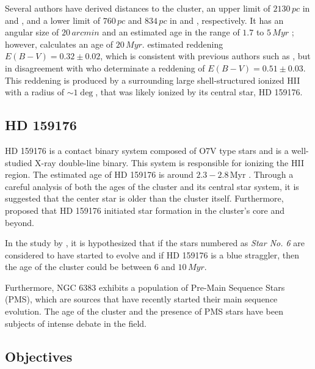 \documentclass[baaa]{baaa}
\begin{document}
Several authors have derived distances to the cluster, an upper limit of $2130\,pc$ in \citet{1930LicOB..14..154T} and \citet{1937LicOB..18...89Z}, and a lower limit of $760\,pc$ and $834\,pc$ in \citet{1949ApJ...110..117S} and \citet{2018A&A...610A..30A}, respectively. It has an angular size of $20\,arcmin$ \citep{2013A&A...560A..76M} and an estimated age in the range of $1.7$ to $5\,Myr$ \citep{1978MNRAS.182..607F,1989MNRAS.236..263P,1991MNRAS.249...76B,2005A&A...438.1163K,2007A&A...462..157P}; however, \citet{1968ArA.....5....1L} calculates an age of $20\,Myr$. \citet{2008hsf2.book..497R} estimated  reddening $E(B-V) = 0.32 \pm 0.02$, which is consistent with previous authors such as \citet{1971A&AS....4..241B,1978MNRAS.182..607F,1978MNRAS.184..661L,1985A&A...151..391T,1989MNRAS.236..263P,1994RMxAA..29..141F,2007A&A...462..157P}, but in disagreement with \citet{2018A&A...610A..30A} who determinate a reddening of $E(B-V) = 0.51 \pm 0.03$. This reddening is produced by a surrounding large shell-structured ionized HII with a radius of $\sim 1\deg$, that was likely ionized by its central star, HD 159176. 

\subsection{HD 159176}
HD 159176 is a contact binary system composed of O7V type stars and is a well-studied X-ray double-line binary. This system is responsible for ionizing the HII region. The estimated age of HD 159176 is around $2.3-2.8$\,Myr \citep{2010A&A...511A..25R}. Through a careful analysis of both the ages of the cluster and its central star system, it is suggested that the center star is older than the cluster itself. Furthermore, \citet{1978MNRAS.182..607F} proposed that HD 159176 initiated star formation in the cluster's core and beyond.

In the study by \citet{2018A&A...610A..30A}, it is hypothesized that if the stars numbered as \textit{Star No. 6} are considered to have started to evolve and if HD 159176 is a blue straggler, then the age of the cluster could be between $6$ and $10\,Myr$.

Furthermore, NGC 6383 exhibits a population of Pre-Main Sequence Stars (PMS), which are sources that have recently started their main sequence evolution. The age of the cluster and the presence of PMS stars have been subjects of intense debate in the field.

\subsection{Objectives}
\end{document}
